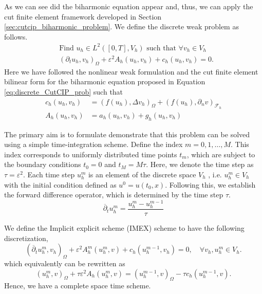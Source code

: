 \documentclass[11pt]{article}
\theoremstyle{remark}
\numberwithin{equation}{section}
\begin{document}
As we can see did the biharmonic equation appear and, thus, we can apply the cut finite element framework developed in Section \ref{sec:cutcip_biharmonic_problem}. We define the discrete weak problem as follows.
\begin{equation}
    \begin{split}
        & \text{Find  }u_{h} \in L^{2}( [0,T],V_{h})  \text{ such that } \forall v_{h} \in V_{h} \\
        & ( \partial_{t} u_{h},v_{h} )_{\Omega }   + \varepsilon^{2} A_{h}( u_{h},v_{h})   +  c_{h}( u_{h},v_{h})  = 0.
    \end{split}
\end{equation}
Here we have followed the nonlinear weak formulation \cite[Equation
4.2]{feng2007fully} and the cut finite element bilinear form for the biharmonic equation proposed in Equation \eqref{eq:discrete_CutCIP_prob} such that
\begin{align}
    c_{h}( u_{h}, v_{h})  & = ( f( u_{h}) ,\Delta v_{h})_{\Omega } +  ( f( u_{h}) , \partial _{n}v)_{\mathcal{F}_{h} } \\
    A_{h}( u_{h}, v_{h})  & =  a_{h}( u_{h}, v_{h}) + g_{h}( u_{h}, v_{h})
\end{align}

The primary aim is to formulate demonstrate that this problem can be solved using a simple time-integration scheme. Define the index $m= 0, 1, \ldots, M$. This index corresponds to uniformly distributed time points $t_{m}$, which are subject to the
boundary conditions $t_{0} = 0$ and $t_{M} = M \tau$. Here, we denote the time step as $\tau = \varepsilon^2$. Each time step $u^{m}_{h}$ is an element of the discrete space $V_{h}$ , i.e. $u^{m}_{h} \in V_{h}$  with the initial condition defined as $u^{0} = u( t_{0},x )$. Following this, we establish the forward difference operator, which is determined by the time step $\tau $.
\begin{equation}
\overline{\partial } _{t} u_{h}^{m} = \frac{u_{h}^{m} - u_{h}^{m-1}}{ \tau }
\end{equation}

We define the Implicit explicit scheme (IMEX) scheme to have the following discretization,
\begin{equation}
( \overline{\partial } _{t} u^{m}_{h}, v_{h}   )_{\Omega } + \varepsilon^{2} A^{m}_{h}( u_{h}^{m} , v) +  c_{h} (  u_{h}^{m-1}, v_{h})  = 0 , \quad \forall v_{h}, u^{m}_{h} \in V^{}_{h}.
\end{equation}
which equivalently can be rewritten as
\begin{equation}
( u_{h}^{m},v )_{\Omega }  + \tau \varepsilon^{2} A_{h}( u_{h}^{m} , v)   =  ( u_{h}^{m-1},v )_{\Omega } - \tau c_{h} (  u_{h}^{m-1}, v) .
\end{equation}
Hence, we have a complete space time scheme.
\end{document}
